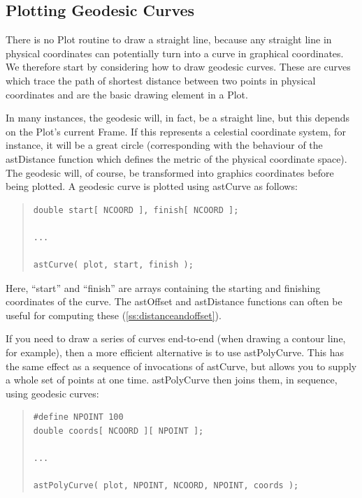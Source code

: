 \documentclass[twoside,11pt]{article}
\newcommand{\htmlref}[2]{#1}
\newcommand{\secref}[1]{\S\ref{#1}}
\renewcommand{\secref}[1]{\ref{#1}}
\begin{document}
\subsection{\label{ss:plottinggeodesics}Plotting Geodesic Curves}

There is no \htmlref{Plot}{Plot} routine to draw a straight line, because any straight
line in physical coordinates can potentially turn into a curve in
graphical coordinates. We therefore start by considering how to draw
geodesic curves.  These are curves which trace the path of shortest
distance between two points in physical coordinates
 and are the basic drawing element in a Plot. 

In many instances, the geodesic will, in fact, be a straight line, but
this depends on the Plot's current \htmlref{Frame}{Frame}. If this represents a
celestial coordinate system, for instance, it will be a great circle
(corresponding with the behaviour of the \htmlref{astDistance}{astDistance} function which
defines the metric of the physical coordinate space).  The geodesic
will, of course, be transformed into graphics coordinates before being
plotted. A geodesic curve is plotted using \htmlref{astCurve}{astCurve} as follows:

\begin{quote}
\small
\begin{verbatim}
double start[ NCOORD ], finish[ NCOORD ];

...

astCurve( plot, start, finish );
\end{verbatim}
\normalsize
\end{quote}

Here, ``start'' and ``finish'' are arrays containing the starting and
finishing coordinates of the curve. The \htmlref{astOffset}{astOffset} and astDistance
functions can often be useful for computing these
(\secref{ss:distanceandoffset}).

If you need to draw a series of curves end-to-end (when drawing a
contour line, for example), then a more efficient alternative is to
use \htmlref{astPolyCurve}{astPolyCurve}. This has the same effect as a sequence of
invocations of astCurve, but allows you to supply a whole set of
points at one time. astPolyCurve then joins them, in sequence, using
geodesic curves:

\begin{quote}
\small
\begin{verbatim}
#define NPOINT 100
double coords[ NCOORD ][ NPOINT ];

...

astPolyCurve( plot, NPOINT, NCOORD, NPOINT, coords );
\end{verbatim}
\normalsize
\end{quote}
\end{document}
